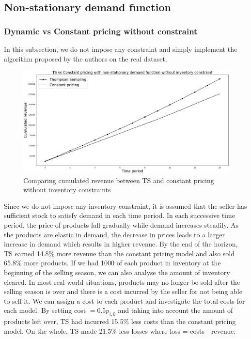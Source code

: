 \documentclass[a4paper]{article}
\begin{document}
\subsection{Non-stationary demand function}
\subsubsection{Dynamic vs Constant pricing without constraint}
In this subsection, we do not impose any constraint and simply implement the algorithm proposed by the authors on the real dataset.
\begin{figure}[h]
	\centering
	\includegraphics[width=1.03\textwidth]{2.png}
	\caption{\label{fig:four}Comparing cumulated revenue between TS and constant pricing without inventory constraints}
\end{figure}
\newline
Since we do not impose any inventory constraint, it is assumed that the seller has sufficient stock to satisfy demand in each time period. In each successive time period, the price of products fall gradually while demand increases steadily. As the products are elastic in demand, the decrease in prices leads to a larger increase in demand which results in higher revenue.
\newline
\newline
By the end of the horizon, TS earned 14.8\% more revenue than the constant pricing model and also sold 65.8\% more products. If we had 1000 of each product in inventory at the beginning of the selling season, we can also analyse the amount of inventory cleared. In most real world situations, products may no longer be sold after the selling season is over and there is a cost incurred by the seller for not being able to sell it. We can assign a cost to each product and investigate the total costs for each model. By setting cost $= 0.5  p_{i,0}$ and taking into account the amount of products left over, TS had incurred 15.5\% less costs than the constant pricing model. On the whole, TS made 21.5\% less losses where loss = costs - revenue.
\end{document}
